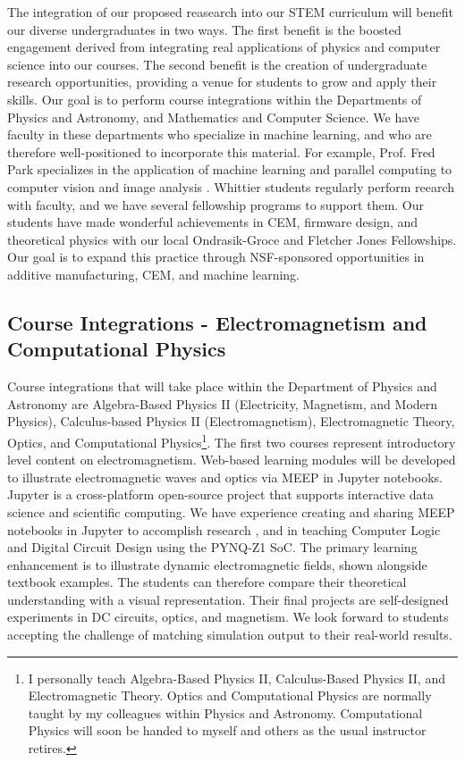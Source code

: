 \documentclass[../../main.tex]{subfiles}
\begin{document}
The integration of our proposed reasearch into our STEM curriculum will benefit our diverse undergraduates in two ways.  The first benefit is the boosted engagement derived from integrating real applications of physics and computer science into our courses.  The second benefit is the creation of undergraduate research opportunities, providing a venue for students to grow and apply their skills.  Our goal is to perform course integrations within the Departments of Physics and Astronomy, and Mathematics and Computer Science.  We have faculty in these departments who specialize in machine learning, and who are therefore well-positioned to incorporate this material.  For example, Prof. Fred Park specializes in the application of machine learning and parallel computing to computer vision and image analysis \cite{SHI201528,doi:10.1137/20M1337041}.  Whittier students regularly perform reearch with faculty, and we have several fellowship programs to support them.  Our students have made wonderful achievements in CEM, firmware design, and theoretical physics with our local Ondrasik-Groce and Fletcher Jones Fellowships.  Our goal is to expand this practice through NSF-sponsored opportunities in additive manufacturing, CEM, and machine learning.

\subsection{Course Integrations - Electromagnetism and Computational Physics}
\label{sec:integration}

Course integrations that will take place within the Department of Physics and Astronomy are Algebra-Based Physics II (Electricity, Magnetism, and Modern Physics), Calculus-based Physics II (Electromagnetism), Electromagnetic Theory, Optics, and Computational Physics\footnote{I personally teach Algebra-Based Physics II, Calculus-Based Physics II, and Electromagnetic Theory.  Optics and Computational Physics are normally taught by my colleagues within Physics and Astronomy.  Computational Physics will soon be handed to myself and others as the usual instructor retires.}.  The first two courses represent introductory level content on electromagnetism.  Web-based learning modules will be developed to illustrate electromagnetic waves and optics via MEEP in Jupyter notebooks.  Jupyter is a cross-platform open-source project that supports interactive data science and scientific computing.  We have experience creating and sharing MEEP notebooks in Jupyter to accomplish research \cite{electronics10040415}, and in teaching Computer Logic and Digital Circuit Design using the PYNQ-Z1 SoC. The primary learning enhancement is to illustrate dynamic electromagnetic fields, shown alongside textbook examples.  The students can therefore compare their theoretical understanding with a visual representation.  Their final projects are self-designed experiments in DC circuits, optics, and magnetism.  We look forward to students accepting the challenge of matching simulation output to their real-world results. \\ \vspace{2.5mm}
\end{document}
